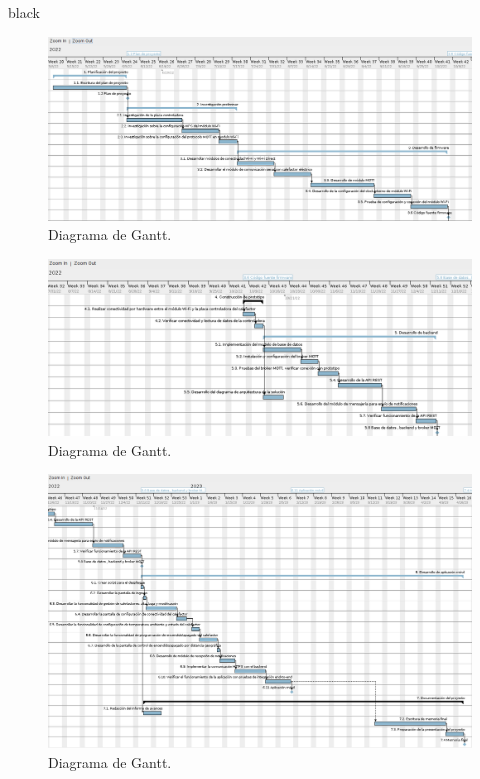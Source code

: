 \documentclass[
11pt, %
codirector, %
]{charter}
\begin{document}
\begin{consigna}{black}
\begin{landscape}
\begin{figure}[htpb]

\includegraphics[height=.65\textheight]{./Figuras/gantt-1.png}
\caption{Diagrama de Gantt. }
\label{fig:diagGantt}
\end{figure}

\end{landscape}
\begin{landscape}
\begin{figure}[htpb]
\centering 
\includegraphics[height=.65\textheight]{./Figuras/gantt-2.png}
\caption{Diagrama de Gantt. }
\label{fig:diagGantt}
\end{figure}

\end{landscape}

\begin{landscape}
\begin{figure}[htpb]
\centering 
\includegraphics[height=1.0\textheight]{./Figuras/gantt-3.png}
\caption{Diagrama de Gantt.}
\label{fig:diagGantt}
\end{figure}

\end{landscape}


\end{consigna}
\end{document}
